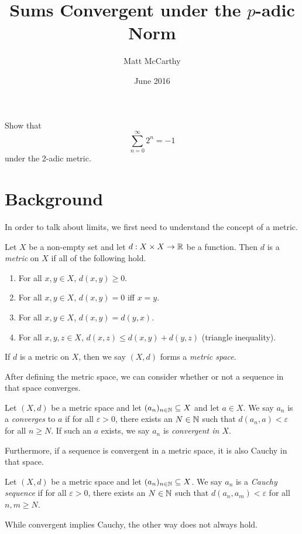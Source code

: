 \documentclass[notitlepage]{problem-solving}
\title{Sums Convergent under the $p$-adic Norm}
\date{June 2016}
\author{Matt McCarthy}
\begin{document}
\maketitle

\begin{problem*}
	Show that
	\[
		\sum_{n=0}^\infty 2^n = -1
	\]
	under the 2-adic metric.
\end{problem*}

\section{Background}

In order to talk about limits, we first need to understand the concept of a metric.
\begin{definition}
	Let $X$ be a non-empty set and let $d:X\times X\rightarrow \mathbb{R}$ be a function.
	Then $d$ is a \textit{metric} on $X$ if all of the following hold.
	\begin{enumerate}
		\item For all $x,y\in X$, $d(x,y)\geq 0$.
		\item For all $x,y\in X$, $d(x,y) = 0$ iff $x=y$.
		\item For all $x,y\in X$, $d(x,y)=d(y,x)$.
		\item For all $x,y,z\in X$, $d(x,z)\leq d(x,y)+d(y,z)$ (triangle inequality).
	\end{enumerate}
	If $d$ is a metric on $X$, then we say $(X,d)$ forms a \textit{metric space}.
\end{definition}
After defining the metric space, we can consider whether or not a sequence in that space converges.
\begin{definition}
	Let $(X,d)$ be a metric space and let $(a_n)_{n\in\mathbb{N}}\subseteq X$ and let $a\in X$.
	We say $a_n$ is a \textit{converges} to $a$ if for all $\varepsilon>0$, there exists an $N\in\mathbb{N}$ such that $d(a_n,a)<\varepsilon$ for all $n\geq N$.
	If such an $a$ exists, we say $a_n$ is \textit{convergent in $X$}.
\end{definition}
Furthermore, if a sequence is convergent in a metric space, it is also Cauchy in that space.
\begin{definition}
	Let $(X,d)$ be a metric space and let $(a_n)_{n\in\mathbb{N}}\subseteq X$.
	We say $a_n$ is a \textit{Cauchy sequence} if for all $\varepsilon>0$, there exists an $N\in\mathbb{N}$ such that $d(a_n,a_m)<\varepsilon$ for all $n,m\geq N$.
\end{definition}
While convergent implies Cauchy, the other way does not always hold.
\end{document}
